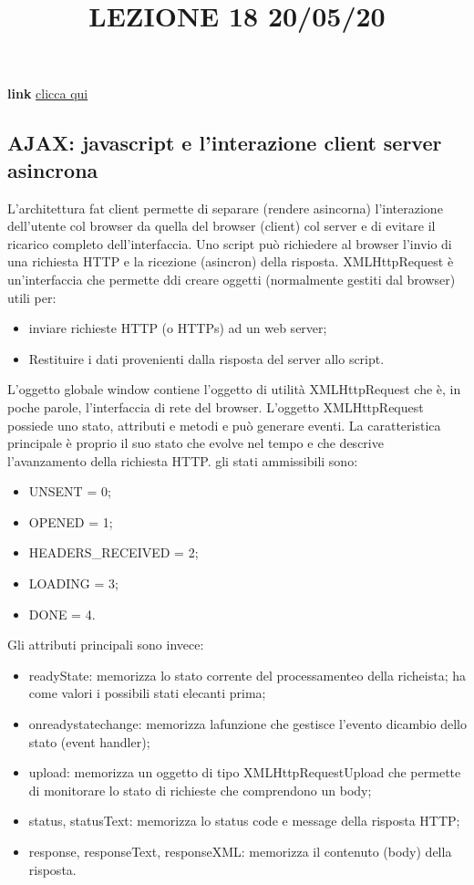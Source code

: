 \title{LEZIONE 18 20/05/20}
\textbf{link} \href{https://web.microsoftstream.com/video/71a20262-9f5a-4991-8c41-af0a21825730?list=user&userId=cfe0965d-9a7c-40e2-be6e-f078296a1914}{clicca qui}
\subsection{AJAX: javascript e l'interazione client server asincrona}
L'architettura fat client permette di separare (rendere asincorna) l'interazione dell'utente col browser da quella del browser (client) col server e di evitare il ricarico completo dell'interfaccia.\newline
\newline
Uno script può richiedere al browser l'invio di una richiesta HTTP e la ricezione (asincron) della risposta.\newline
XMLHttpRequest è un'interfaccia che permette ddi creare oggetti (normalmente gestiti dal browser) utili per:
\begin{itemize}
    \item inviare richieste HTTP (o HTTPs) ad un web server;
    \item Restituire i dati provenienti dalla risposta del server allo script.
\end{itemize}
L'oggetto globale window contiene l'oggetto di utilità XMLHttpRequest che è, in poche parole, l'interfaccia di rete del browser.\newline
\newline
L'oggetto XMLHttpRequest possiede uno stato, attributi e metodi e può generare eventi.\newline
La caratteristica principale è proprio il suo stato che evolve nel tempo e che descrive l'avanzamento della richiesta HTTP. gli stati ammissibili sono:
\begin{itemize}
    \item UNSENT = 0;
    \item OPENED = 1;
    \item HEADERS\_RECEIVED = 2;
    \item LOADING = 3;
    \item DONE = 4.
\end{itemize}
Gli attributi principali sono invece:
\begin{itemize}
    \item readyState: memorizza lo stato corrente del processamenteo della richeista; ha come valori i possibili stati elecanti prima;
    \item onreadystatechange: memorizza lafunzione che gestisce l'evento dicambio dello stato (event handler);
    \item upload: memorizza un oggetto di tipo XMLHttpRequestUpload che permette di monitorare lo stato di richieste che comprendono un body;
    \item status, statusText: memorizza lo status code e message della risposta HTTP;
    \item response, responseText, responseXML: memorizza il contenuto (body) della risposta.
\end{itemize}
